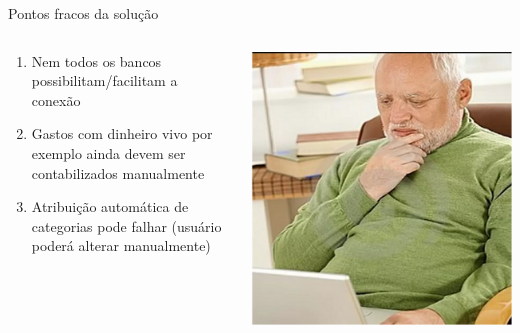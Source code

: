 \documentclass[12pt]{beamer}
\begin{document}
\begin{frame}{Pontos fracos da solução}
    \begin{columns}
        \begin{column}{0.65\textwidth}
            \begin{enumerate}[label=•]
                \item Nem todos os bancos possibilitam/facilitam a conexão
                \item Gastos com dinheiro vivo por exemplo ainda devem ser contabilizados manualmente
                \item Atribuição automática de categorias pode falhar (usuário poderá alterar manualmente)
            \end{enumerate}
        \end{column}
        
        \begin{column}{0.35\textwidth}
            \begin{center}
                \includegraphics[width=1\textwidth]{figuras/haroldpensando.jpg}
             \end{center}
        \end{column}
    \end{columns}
\end{frame}
\end{document}
